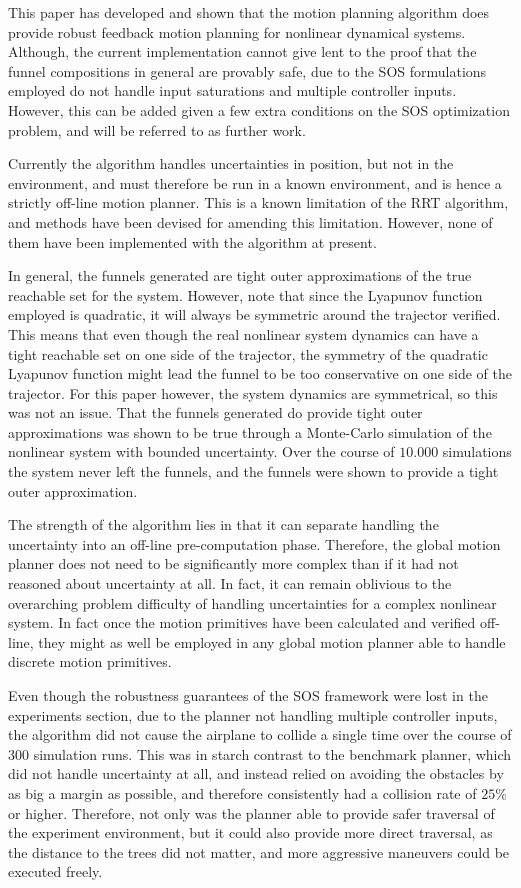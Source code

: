 
This paper has developed and shown that the \rrtfunnel{} motion planning
algorithm does provide robust feedback motion planning for nonlinear dynamical
systems. Although, the current implementation cannot give lent to the proof that
the funnel compositions in general are provably safe, due to the \ac{SOS}
formulations employed do not handle input saturations and multiple controller
inputs. However, this can be added given a few extra conditions on the \ac{SOS}
optimization problem, and will be referred to as further work.


Currently the algorithm handles uncertainties in position, but not in the
environment, and must therefore be run in a known environment, and is hence a
strictly off-line motion planner. This is a known limitation of the \ac{RRT}
algorithm, and methods have been devised for amending this limitation. However,
none of them have been implemented with the \rrtfunnel{} algorithm at present.


In general, the funnels generated are tight outer approximations of the true
reachable set for the system. However, note that since the Lyapunov function
employed is quadratic, it will always be symmetric around the trajector
verified. This means that even though the real nonlinear system dynamics can
have a tight reachable set on one side of the trajector, the symmetry of the
quadratic Lyapunov function might lead the funnel to be too conservative on one
side of the trajector. For this paper however, the system dynamics are
symmetrical, so this was not an issue. That the funnels generated do provide
tight outer approximations was shown to be true through a Monte-Carlo simulation
of the nonlinear system with bounded uncertainty. Over the course of \(10.000\)
simulations the system never left the funnels, and the funnels were shown to
provide a tight outer approximation.


The strength of the algorithm lies in that it can separate handling the
uncertainty into an off-line pre-computation phase. Therefore, the global motion
planner does not need to be significantly more complex than if it had not
reasoned about uncertainty at all. In fact, it can remain oblivious to the
overarching problem difficulty of handling uncertainties for a complex nonlinear
system. In fact once the motion primitives have been calculated and verified
off-line, they might as well be employed in any global motion planner able to
handle discrete motion primitives.


Even though the robustness guarantees of the \ac{SOS} framework were lost in the
experiments section, due to the planner not handling multiple controller inputs,
the \rrtfunnel{} algorithm did not cause the airplane to collide a single time
over the course of \(300\) simulation runs. This was in starch contrast to the
benchmark planner, which did not handle uncertainty at all, and instead relied
on avoiding the obstacles by as big a margin as possible, and therefore
consistently had a collision rate of \(25\%\) or higher. Therefore, not only was
the \rrtfunnel{} planner able to provide safer traversal of the experiment
environment, but it could also provide more direct traversal, as the distance to
the trees did not matter, and more aggressive maneuvers could be executed
freely.

